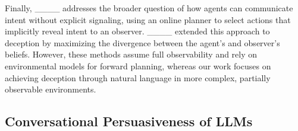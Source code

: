 
Finally, ____ addresses the broader question of how agents can communicate intent without explicit signaling, using an online planner to select actions that implicitly reveal intent to an observer. 
____ extended this approach to deception by maximizing the divergence between the agent's and observer's beliefs. 
However, these methods assume full observability and rely on environmental models for forward planning, whereas our work focuses on achieving deception through natural language in more complex, partially observable environments.

\subsection{Conversational Persuasiveness of LLMs}\label{sec:persuasion}


